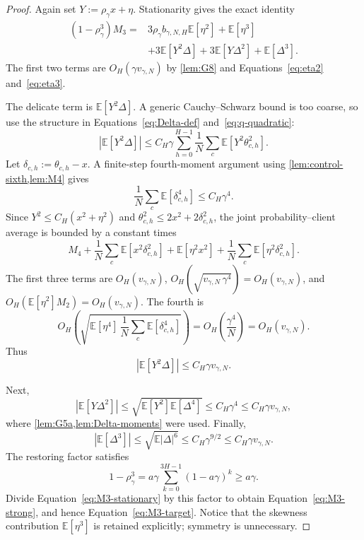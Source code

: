 \documentclass[11pt]{article}
\theoremstyle{definition}
\newcommand{\E}{\mathbb{E}}
\newcommand{\fourthscale}{v_{\gamma,N}}
\newcommand{\bstat}{b_{\gamma,N,H}}
\newcommand{\delt}{\delta}
\begin{document}
\begin{proof}
Again set $Y:=\rho_\gamma x+\eta$. Stationarity gives the exact identity
\begin{equation}
\label{eq:M3-stationary}
\begin{aligned}
  (1-\rho_\gamma^3)M_3={}&
  3\rho_\gamma\bstat\E[\eta^2]+\E[\eta^3]\\
  &+3\E[Y^2\Delta]
  +3\E[Y\Delta^2]
  +\E[\Delta^3].
\end{aligned}
\end{equation}
The first two terms are $O_H(\gamma\fourthscale)$ by \cref{lem:G8} and Equations~\eqref{eq:eta2} and~\eqref{eq:eta3}.

The delicate term is $\E[Y^2\Delta]$. A generic Cauchy--Schwarz bound is too coarse, so use the structure in Equations~\eqref{eq:Delta-def} and~\eqref{eq:q-quadratic}:
\[
  |\E[Y^2\Delta]|
  \le C_H\gamma\sum_{h=0}^{H-1}
  \frac1N\sum_c\E[Y^2\theta_{c,h}^2].
\]
Let $\delt_{c,h}:=\theta_{c,h}-x$. A finite-step fourth-moment argument using \cref{lem:control-sixth,lem:M4} gives
\begin{equation}
\label{eq:disp4}
  \frac1N\sum_c\E[\delt_{c,h}^4]\le C_H\gamma^4.
\end{equation}
Since $Y^2\le C_H(x^2+\eta^2)$ and $\theta_{c,h}^2\le2x^2+2\delt_{c,h}^2$, the joint probability--client average is bounded by a constant times
\[
  M_4
  +\frac1N\sum_c\E[x^2\delt_{c,h}^2]
  +\E[\eta^2x^2]
  +\frac1N\sum_c\E[\eta^2\delt_{c,h}^2].
\]
The first three terms are
$O_H(\fourthscale)$,
$O_H(\sqrt{\fourthscale\,\gamma^4})=O_H(\fourthscale)$, and
$O_H(\E[\eta^2]M_2)=O_H(\fourthscale)$.
The fourth is
\[
  O_H\!\left(\sqrt{\E[\eta^4]\,\frac1N\sum_c\E[\delt_{c,h}^4]}\right)
  =O_H\left(\frac{\gamma^4}{N}\right)
  =O_H(\fourthscale).
\]
Thus
\begin{equation}
\label{eq:Y2Delta}
  |\E[Y^2\Delta]|\le C_H\gamma\fourthscale.
\end{equation}

Next,
\[
  |\E[Y\Delta^2]|
  \le \sqrt{\E[Y^2]\E[\Delta^4]}
  \le C_H\gamma^4
  \le C_H\gamma\fourthscale,
\]
where \cref{lem:G5a,lem:Delta-moments} were used. Finally,
\[
  |\E[\Delta^3]|\le \sqrt{\E|\Delta|^6}\le C_H\gamma^{9/2}
  \le C_H\gamma\fourthscale.
\]
The restoring factor satisfies
\[
  1-\rho_\gamma^3
  =a\gamma\sum_{k=0}^{3H-1}(1-a\gamma)^k
  \ge a\gamma.
\]
Divide Equation~\eqref{eq:M3-stationary} by this factor to obtain Equation~\eqref{eq:M3-strong}, and hence Equation~\eqref{eq:M3-target}. Notice that the skewness contribution $\E[\eta^3]$ is retained explicitly; symmetry is unnecessary.
\end{proof}
\end{document}
